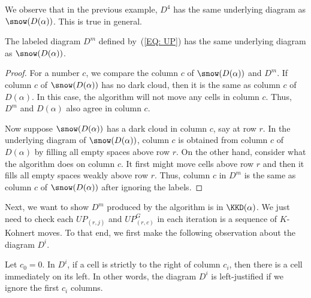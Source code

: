 We observe that in the previous example, 
$D^4$ has the same underlying diagram as $\snow(D(\alpha))$.
This is true in general.

\begin{lem}
The labeled diagram $D^m$ defined by~(\ref{EQ: UP})
has the same underlying diagram as $\snow(D(\alpha))$.
\end{lem}
\begin{proof}
For a number $c$, 
we compare the column $c$ 
of $\snow(D(\alpha))$ and $D^m$.
If column $c$ of $\snow(D(\alpha))$ has no dark cloud,
then it is the same as column $c$ of $D(\alpha)$.
In this case, the algorithm will not move any cells 
in column $c$.
Thus, $D^m$ and $D(\alpha)$ also agree in column $c$.

Now suppose $\snow(D(\alpha))$ has a dark cloud
in column $c$, say at row $r$.
In the underlying diagram of $\snow(D(\alpha))$,
column $c$ is obtained from column $c$ of $D(\alpha)$ 
by filling all empty spaces above row $r$.  
On the other hand, consider what the algorithm does on column $c$.
It first might move cells above row $r$
and then it fills all empty spaces weakly above row $r$.
Thus, column $c$ in $D^m$ is the same as 
column $c$ of $\snow(D(\alpha))$ after ignoring the labels.  
\end{proof}

Next, we want to show $D^m$ produced by the algorithm
is in $\KKD(\alpha)$.
We just need to check each $UP_{(r,j)}$ and $UP^G_{(r,c)}$ in each iteration is a sequence of $K$-Kohnert moves. To that end, we first make the following observation about the diagram $D^i$.

\begin{lemma}
Let $c_0 = 0$. In $D^i$,
if a cell is strictly to the right of column $c_i$,
then there is a cell immediately on its left.
In other words, 
the diagram $D^i$ is left-justified if we ignore the first $c_i$ columns.
\end{lemma}

